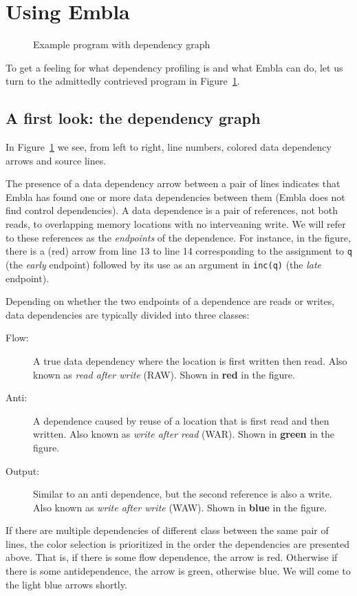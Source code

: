 \section{Using Embla}

\begin{figure} 
\small

\caption{Example program with dependency graph} \label{ffirstex}
\end{figure}

To get a feeling for what dependency profiling is and what Embla can do, 
let us turn to the admittedly contrieved program in Figure~\ref{ffirstex}. 

\subsection{A first look: the dependency graph}

In Figure~\ref{ffirstex} we see, from 
left to right, line numbers, colored data dependency arrows and source 
lines. 

The presence of a data dependency arrow between a pair of lines indicates
that Embla has found one or more data dependencies between them
(Embla does not find control dependencies). A data dependence is a pair
of references, not both reads, to overlapping memory
locations with no interveaning write. We will refer to these
references as the {\em endpoints} of the dependence.
For instance, in the figure, 
there is a (red) arrow from line 13 to line 14 corresponding to
the assignment to {\tt q} (the {\em early} endpoint) followed by its use 
as an argument in {\tt inc(q)} (the {\em late} endpoint).

Depending on whether the two endpoints of a dependence
are reads or writes, data dependencies are typically divided into 
three classes:
\begin{description}
\item[Flow:]
A true data dependency where the location is first written then
read. Also known as {\em read after write} (RAW). Shown in 
{\bf \color{red} red} in the figure.
\item[Anti:]
A dependence caused by reuse of a location that is first read and then
written. Also known as {\em write after read} (WAR). Shown in 
{\bf \color{green} green} in the figure.
\item[Output:]
Similar to an anti dependence, but the second reference is also a
write. Also known as {\em write after write} (WAW). Shown in 
{\bf \color{blue} blue} in the figure.
\end{description}
If there are multiple dependencies of different class between the 
same pair of lines, the color selection is prioritized in the
order the dependencies are presented above. That is, if there is
some flow dependence, the arrow is red. Otherwise if there is 
some antidependence, the arrow is green, otherwise blue. We will 
come to the light blue arrows shortly.


